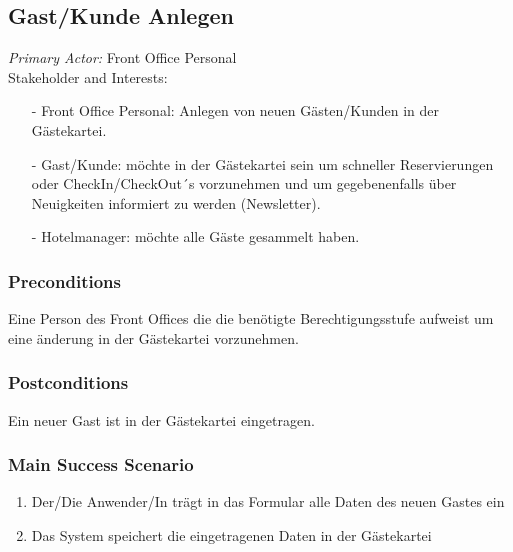\documentclass[./detailed_overview_usecases.tex]{subfiles}
\begin{document}
    \subsection{Gast/Kunde Anlegen}
    \textit{Primary Actor:}
    Front Office Personal
    \\
    Stakeholder and Interests:
    \begin{itemize}
        \item[-] Front Office Personal: Anlegen von neuen Gästen/Kunden in der Gästekartei.
        \item[-] Gast/Kunde: möchte in der Gästekartei sein um schneller Reservierungen oder CheckIn/CheckOut´s vorzunehmen
        und um gegebenenfalls über Neuigkeiten informiert zu werden (Newsletter).
        \item[-] Hotelmanager: möchte alle Gäste gesammelt haben.
    \end{itemize}

    \subsubsection*{Preconditions}
    Eine Person des Front Offices die die benötigte Berechtigungsstufe aufweist um eine änderung in der Gästekartei vorzunehmen.

    \subsubsection*{Postconditions}
    Ein neuer Gast ist in der Gästekartei eingetragen.

    \subsubsection*{Main Success Scenario}
    \begin{enumerate}
        \item Der/Die Anwender/In trägt in das Formular alle Daten des neuen Gastes ein
        \item Das System speichert die eingetragenen Daten in der Gästekartei
    \end{enumerate}
\end{document}
